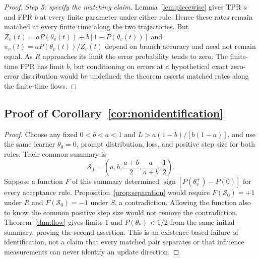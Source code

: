 \begin{proof}
\textit{Step 5: specify the matching claim.}
Lemma~\ref{lem:piecewise} gives TPR $a$ and FPR $b$ at every finite
parameter under either rule. Hence these rates remain matched at every
finite time along the two trajectories. But
$Z_v(t)=aP(\theta_v(t))+b[1-P(\theta_v(t))]$ and
$\pi_v(t)=aP(\theta_v(t))/Z_v(t)$ depend on branch accuracy and need not
remain equal. As $R$ approaches its limit the error probability tends
to zero. The finite-time FPR has limit $b$, but conditioning on errors
at a hypothetical exact zero-error distribution would be undefined;
the theorem asserts matched rates along the finite-time flows.
\end{proof}

\subsection{Proof of Corollary~\ref{cor:nonidentification}}
\begin{proof}
Choose any fixed $0<b<a<1$ and $L>a(1-b)/[b(1-a)]$, and use the same
learner $\theta_0=0$, prompt distribution, loss, and positive step size for
both rules. Their common summary is
\[
 \mathcal S_0=\left(a,b,\frac{a+b}{2},\frac{a}{a+b},\frac12\right).
\]
Suppose a function $F$ of this summary determined
$\operatorname{sign}[P(\theta_v^+)-P(0)]$ for every acceptance rule.
Proposition~\ref{prop:separation} would require $F(\mathcal S_0)=+1$
under $R$ and $F(\mathcal S_0)=-1$ under $S$, a contradiction. Allowing
the function also to know the common positive step size would not remove
the contradiction. Theorem~\ref{thm:flow} gives limits $1$ and
$P(\theta_*)<1/2$ from the same initial summary, proving the second
assertion. This is an existence-based failure of identification, not a
claim that every matched pair separates or that influence measurements
can never identify an update direction.
\end{proof}

